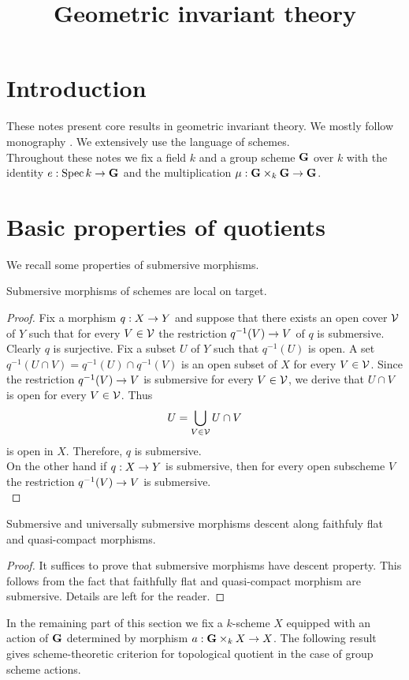 



\title{Geometric invariant theory}
\date{}
\maketitle

\section{Introduction}
\noindent
These notes present core results in geometric invariant theory. We mostly follow monography \cite{mumford1994geometric}. We extensively use the language of schemes.\\
Throughout these notes we fix a field $k$ and a group scheme $\mathbf{G}$ over $k$ with the identity $e:\mathrm{Spec}\, k\rightarrow \mathbf{G}$ and the multiplication $\mu:\mathbf{G}\times_k\mathbf{G}\rightarrow \mathbf{G}$. 

\section{Basic properties of quotients}
\noindent
We recall some properties of submersive morphisms.

\begin{fact}\label{fact:submersive_morphisms_are_local_on_target}
Submersive morphisms of schemes are local on target.
\end{fact}
\begin{proof}
Fix a morphism $q:X\rightarrow Y$ and suppose that there exists an open cover ${\mathcal V}$ of $Y$ such that for every $V\in {\mathcal V}$ the restriction $q^{-1}(V)\rightarrow V$ of $q$ is submersive. Clearly $q$ is surjective. Fix a subset $U$ of $Y$ such that $q^{-1}(U)$ is open. A set $q^{-1}(U\cap V) = q^{-1}(U)\cap q^{-1}(V)$ is an open subset of $X$ for every $V\in {\mathcal V}$. Since the restriction $q^{-1}(V)\rightarrow V$ is submersive for every $V\in {\mathcal V}$, we derive that $U\cap V$ is open for every $V\in {\mathcal V}$. Thus
$$U = \bigcup_{V\in {\mathcal V}}U\cap V$$
is open in $X$. Therefore, $q$ is submersive.\\
On the other hand if $q:X\rightarrow Y$ is submersive, then for every open subscheme $V$ the restriction $q^{-1}(V)\rightarrow V$ is submersive.\\
\end{proof}

\begin{fact}\label{fact:submersive_and_universally_submersive_descent_along_fpgc}
Submersive and universally submersive morphisms descent along faithfuly flat and quasi-compact morphisms.
\end{fact}
\begin{proof}
It suffices to prove that submersive morphisms have descent property. This follows from the fact that faithfully flat and quasi-compact morphism are submersive. Details are left for the reader.
\end{proof}
\noindent
In the remaining part of this section we fix a $k$-scheme $X$ equipped with an action of $\mathbf{G}$ determined by morphism $a:\mathbf{G}\times_kX\rightarrow X$. The following result gives scheme-theoretic criterion for topological quotient in the case of group scheme actions.


